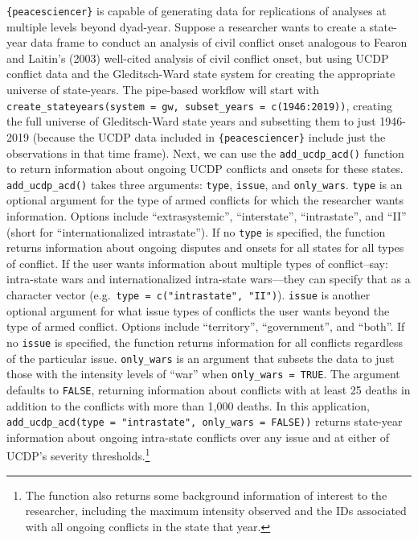 \documentclass[
  11pt,
]{article}
\begin{document}
\texttt{\{peacesciencer\}} is capable of generating data for replications of analyses at multiple levels beyond dyad-year. Suppose a researcher wants to create a state-year data frame to conduct an analysis of civil conflict onset analogous to Fearon and Laitin's (2003) well-cited analysis of civil conflict onset, but using UCDP conflict data and the Gleditsch-Ward state system for creating the appropriate universe of state-years. The pipe-based workflow will start with \texttt{create\_stateyears(system\ =\ \textquotesingle{}gw\textquotesingle{},\ subset\_years\ =\ c(1946:2019))}, creating the full universe of Gleditsch-Ward state years and subsetting them to just 1946-2019 (because the UCDP data included in \texttt{\{peacesciencer\}} include just the observations in that time frame). Next, we can use the \texttt{add\_ucdp\_acd()} function to return information about ongoing UCDP conflicts and onsets for these states. \texttt{add\_ucdp\_acd()} takes three arguments: \texttt{type}, \texttt{issue}, and \texttt{only\_wars}. \texttt{type} is an optional argument for the type of armed conflicts for which the researcher wants information. Options include ``extrasystemic'', ``interstate'', ``intrastate'', and ``II'' (short for ``internationalized intrastate''). If no \texttt{type} is specified, the function returns information about ongoing disputes and onsets for all states for all types of conflict. If the user wants information about multiple types of conflict--say: intra-state wars and internationalized intra-state wars---they can specify that as a character vector (e.g.~\texttt{type\ =\ c("intrastate",\ "II")}). \texttt{issue} is another optional argument for what issue types of conflicts the user wants beyond the type of armed conflict. Options include ``territory'', ``government'', and ``both''. If no \texttt{issue} is specified, the function returns information for all conflicts regardless of the particular issue. \texttt{only\_wars} is an argument that subsets the data to just those with the intensity levels of ``war'' when \texttt{only\_wars\ =\ TRUE}. The argument defaults to \texttt{FALSE}, returning information about conflicts with at least 25 deaths in addition to the conflicts with more than 1,000 deaths. In this application, \texttt{add\_ucdp\_acd(type\ =\ "intrastate",\ only\_wars\ =\ FALSE))} returns state-year information about ongoing intra-state conflicts over any issue and at either of UCDP's severity thresholds.\footnote{The function also returns some background information of interest to the researcher, including the maximum intensity observed and the IDs associated with all ongoing conflicts in the state that year.}
\end{document}

